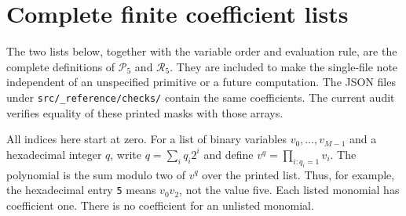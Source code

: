 \section{Complete finite coefficient lists}\label{app:tables}
The two lists below, together with the variable order and evaluation rule, are the complete definitions of $\mathcal P_5$ and $\mathcal R_5$. They are included to make the single-file note independent of an unspecified primitive or a future computation. The JSON files under \texttt{src/\_reference/checks/} contain the same coefficients. The current audit verifies equality of these printed masks with those arrays.

All indices here start at zero. For a list of binary variables $v_0,\ldots,v_{M-1}$ and a hexadecimal integer $q$, write $q=\sum_i q_i2^i$ and define $v^q=\prod_{i:q_i=1}v_i$. The polynomial is the sum modulo two of $v^q$ over the printed list. Thus, for example, the hexadecimal entry \texttt{5} means $v_0v_2$, not the value five. Each listed monomial has coefficient one. There is no coefficient for an unlisted monomial.


